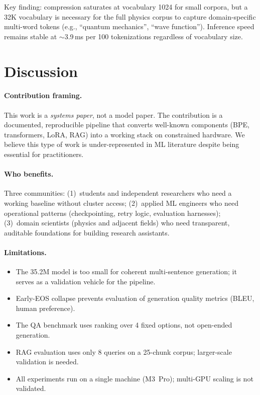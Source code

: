 \documentclass[11pt]{article}
\begin{document}
Key finding: compression saturates at vocabulary 1024 for small corpora, but a 32K vocabulary is necessary for the full physics corpus to capture domain-specific multi-word tokens (e.g., ``quantum mechanics'', ``wave function''). Inference speed remains stable at $\sim$3.9\,ms per 100 tokenizations regardless of vocabulary size.

\section{Discussion}
\label{sec:discussion}

\paragraph{Contribution framing.}
This work is a \emph{systems paper}, not a model paper. The contribution is a documented, reproducible pipeline that converts well-known components (BPE, transformers, LoRA, RAG) into a working stack on constrained hardware. We believe this type of work is under-represented in ML literature despite being essential for practitioners.

\paragraph{Who benefits.}
Three communities: (1)~students and independent researchers who need a working baseline without cluster access; (2)~applied ML engineers who need operational patterns (checkpointing, retry logic, evaluation harnesses); (3)~domain scientists (physics and adjacent fields) who need transparent, auditable foundations for building research assistants.

\paragraph{Limitations.}
\begin{itemize}[leftmargin=*]
    \item The 35.2M model is too small for coherent multi-sentence generation; it serves as a validation vehicle for the pipeline.
    \item Early-EOS collapse prevents evaluation of generation quality metrics (BLEU, human preference).
    \item The QA benchmark uses ranking over 4 fixed options, not open-ended generation.
    \item RAG evaluation uses only 8 queries on a 25-chunk corpus; larger-scale validation is needed.
    \item All experiments run on a single machine (M3~Pro); multi-GPU scaling is not validated.
\end{itemize}
\end{document}
